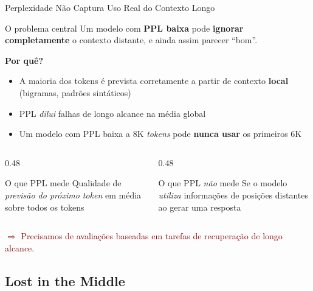 \documentclass[aspectratio=169, xcolor=dvipsnames]{beamer}
\begin{document}
  \begin{frame}{Perplexidade Não Captura Uso Real do Contexto Longo}
    \begin{alertblock}{O problema central}
      Um modelo com \textbf{PPL baixa} pode \textbf{ignorar completamente} o contexto distante, e ainda assim parecer ``bom''.
    \end{alertblock}

    \textbf{Por quê?}
    \begin{itemize}
      \item A maioria dos tokens é prevista corretamente a partir de contexto \textbf{local} (bigramas, padrões sintáticos)
      \item PPL \textit{dilui} falhas de longo alcance na média global
      \item Um modelo com PPL baixa a 8K \textit{tokens} pode \textbf{nunca usar} os primeiros 6K
    \end{itemize}

    \begin{columns}[T]
      \begin{column}{0.48\textwidth}
        \begin{block}{O que PPL mede}
          Qualidade de \textit{previsão do próximo token} em média sobre todos os tokens
        \end{block}
      \end{column}
      \begin{column}{0.48\textwidth}
        \begin{alertblock}{O que PPL \textit{não} mede}
          Se o modelo \textit{utiliza} informações de posições distantes ao gerar uma resposta
        \end{alertblock}
      \end{column}
    \end{columns}

    \vspace{0.1em}
    \textcolor{DarkRed}{$\Rightarrow$ Precisamos de avaliações baseadas em tarefas de recuperação de longo alcance.}
  \end{frame}

  \subsection{Lost in the Middle}
\end{document}
